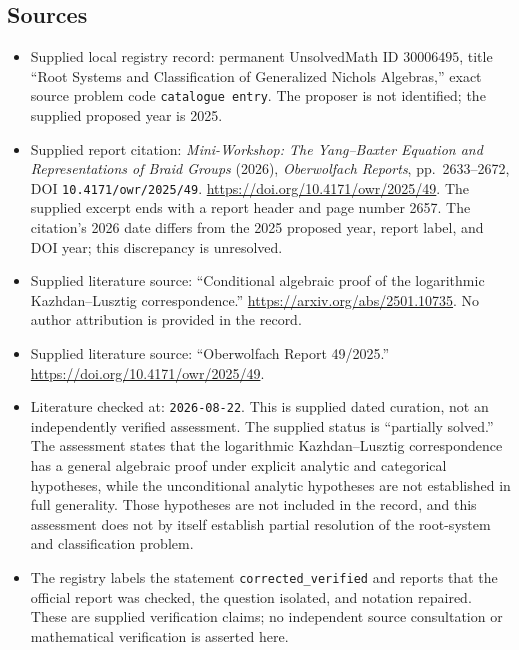 \documentclass[11pt]{article}
\begin{document}
\subsection{Sources}
\begin{itemize}
\item Supplied local registry record: permanent UnsolvedMath ID \(30006495\), title ``Root Systems and Classification of Generalized Nichols Algebras,'' exact source problem code \texttt{catalogue entry}. The proposer is not identified; the supplied proposed year is 2025.
\item Supplied report citation: \emph{Mini-Workshop: The Yang--Baxter Equation and Representations of Braid Groups} (2026), \emph{Oberwolfach Reports}, pp.~2633--2672, DOI \texttt{10.4171/owr/2025/49}. \url{https://doi.org/10.4171/owr/2025/49}. The supplied excerpt ends with a report header and page number 2657. The citation's 2026 date differs from the 2025 proposed year, report label, and DOI year; this discrepancy is unresolved.
\item Supplied literature source: ``Conditional algebraic proof of the logarithmic Kazhdan--Lusztig correspondence.'' \url{https://arxiv.org/abs/2501.10735}. No author attribution is provided in the record.
\item Supplied literature source: ``Oberwolfach Report 49/2025.'' \url{https://doi.org/10.4171/owr/2025/49}.
\item Literature checked at: \texttt{2026-08-22}. This is supplied dated curation, not an independently verified assessment. The supplied status is ``partially solved.'' The assessment states that the logarithmic Kazhdan--Lusztig correspondence has a general algebraic proof under explicit analytic and categorical hypotheses, while the unconditional analytic hypotheses are not established in full generality. Those hypotheses are not included in the record, and this assessment does not by itself establish partial resolution of the root-system and classification problem.
\item The registry labels the statement \texttt{corrected\_verified} and reports that the official report was checked, the question isolated, and notation repaired. These are supplied verification claims; no independent source consultation or mathematical verification is asserted here.
\end{itemize}
\end{document}
